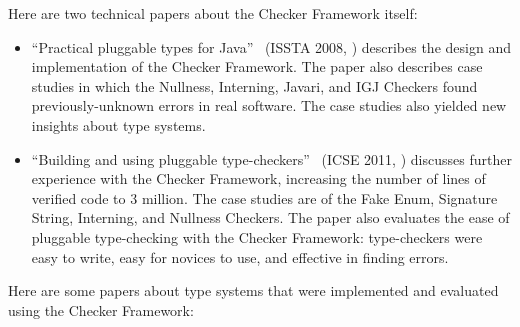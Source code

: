 Here are two technical papers about the Checker Framework itself:

\begin{itemize}
\item
``Practical pluggable types for Java''~\cite{PapiACPE2008}
(ISSTA 2008, )
describes the design and implementation of the Checker Framework.
The paper also describes case
studies in which the Nullness, Interning, Javari, and IGJ Checkers found
previously-unknown errors in real software.
The case studies also yielded new insights about type systems.

\item
``Building and using pluggable
type-checkers''~\cite{DietlDEMS2011}
(ICSE 2011, )
discusses further experience with the Checker Framework, increasing the
number of lines of verified code to 3 million.  The case studies are of the
Fake Enum, Signature String, Interning, and Nullness Checkers.
The paper also evaluates the ease
of pluggable type-checking with the Checker Framework:  type-checkers
were easy to write, easy for novices to use, and effective in finding
errors.
\end{itemize}

Here are some papers about type systems that were implemented and evaluated
using the Checker Framework:

